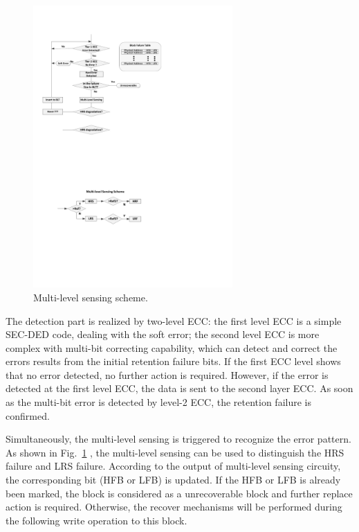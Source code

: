 \begin{figure}[!t]
\centering
    \includegraphics[width=3in]{./fig/sense.pdf}
\caption{Multi-level sensing scheme.}
\label{fig:sense}
\end{figure}


The detection part is realized by two-level ECC: the first level ECC is a simple SEC-DED code, dealing with the soft error; the second level ECC is more complex with multi-bit correcting capability, which can detect and correct the errors results from the initial retention failure bits. If the first ECC level shows that no error detected, no further action is required. However, if the error is detected at the first level ECC, the data is sent to the second layer ECC. As soon as the multi-bit error is detected by level-2 ECC, the retention failure is confirmed. 

Simultaneously, the multi-level sensing is triggered to recognize the error pattern. As shown in Fig.~\ref{fig:sense} , the multi-level sensing can be used to distinguish the HRS failure and LRS failure. According to the output of multi-level sensing circuity, the corresponding bit (HFB or LFB) is updated. If the HFB or LFB is already been marked, the block is considered as a unrecoverable block and further replace action is required. Otherwise, the recover mechanisms will be performed during the following write operation to this block.

 

